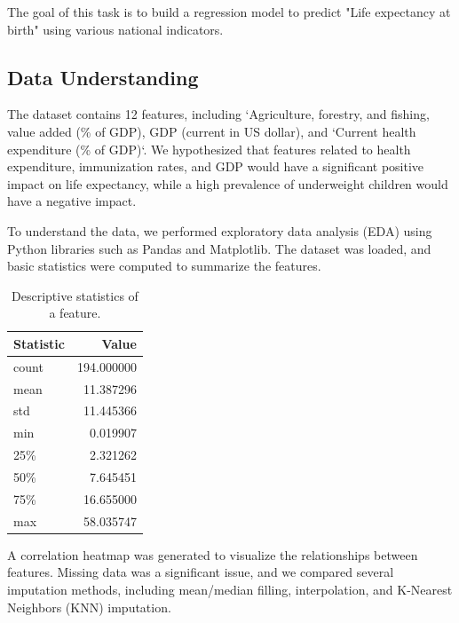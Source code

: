 \documentclass{article}
\begin{document}
The goal of this task is to build a regression model to predict "Life expectancy at birth" using various 
national indicators.
\subsection{Data Understanding}
\label{ssec:data_understanding}

The dataset contains 12 features, including `Agriculture, forestry, and fishing, value added 
(\% of GDP), GDP (current in US dollar), and `Current health expenditure (\% of GDP)`. We hypothesized that 
features related to health expenditure, immunization rates, and GDP would have a significant positive 
impact on life expectancy, while a high prevalence of underweight children would have a negative impact.

To understand the data, we performed exploratory data analysis (EDA) using Python libraries such as Pandas 
and Matplotlib. The dataset was loaded, and basic statistics were computed to summarize the features.
\begin{table}[h]
    \centering
    \begin{tabular}{|l|r|}
        \hline
        \textbf{Statistic} & \textbf{Value} \\
        \hline
        count & 194.000000 \\
        mean & 11.387296 \\
        std & 11.445366 \\
        min & 0.019907 \\
        25\% & 2.321262 \\
        50\% & 7.645451 \\
        75\% & 16.655000 \\
        max & 58.035747 \\
        \hline
    \end{tabular}
    \caption{Descriptive statistics of a feature.}
    \label{tab:desc_stats}
\end{table}

A correlation heatmap was generated to visualize the relationships between features. Missing data 
was a significant issue, and we compared several imputation methods, including mean/median filling, 
interpolation, and K-Nearest Neighbors (KNN) \cite{Cover1967} imputation.
\end{document}
